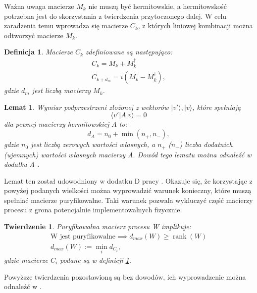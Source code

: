 \documentclass[10pt]{article} %
\newtheorem{definicja}{Definicja}
\newtheorem{tw}{Twierdzenie}
\newtheorem{lm}{Lemat}
\DeclareMathOperator{\Rank}{rank}
\newcommand{\Ket}[1]{|#1\rangle}
\newcommand{\Bra}[1]{\langle#1|}
\newcommand{\LPV}{{L^\perp_V}}
\begin{document}
Ważna uwaga macierze $M_k$ nie muszą być hermitowskie, a hermitowskość potrzebna jest do skorzystania z twierdzenia przytoczonego dalej. W celu zaradzenia temu wprowadza się macierze $C_k$, z których liniowej kombinacji można odtworzyć macierze $M_k$.
\begin{definicja}
\label{ck}
Macierze $C_k$ zdefiniowane są następująco:
\begin{equation}
\begin{gathered}
C_k = M_k + M_k^\dag \\
C_{k+d_m} = i(M_k - M_k^\dag),
\end{gathered}
\end{equation}
gdzie $d_m$ jest liczbą macierzy $M_k$.
\end{definicja}
\begin{lm}
Wymiar podprzestrzeni złożonej z wektorów $\Ket{v'}, \Ket{v}$, które spełniają
\begin{equation}
\Bra{v'}A\Ket{v} = 0
\end{equation} dla pewnej macierzy hermitowskiej $A$ to:
\begin{equation}
d_{A} = n_{0} + \min(n_{+}, n_{-}),
\end{equation}
gdzie $n_{0}$ jest liczbą zerowych wartości własnych, a $n_{+}$ ($n_{-}$) liczba dodatnich (ujemnych) wartości własnych macierzy A. Dowód tego lematu można odnaleźć w dodatku A \cite{purification}.
\end{lm}
Lemat ten został udowodniony w dodatku D pracy \cite{purification}.
Okazuje się, że korzystając z powyżej podanych wielkości można wyprowadzić warunek konieczny, które muszą spełniać macierze puryfikowalne. Taki warunek pozwala wykluczyć część macierzy procesu z grona potencjalnie implementowalnych fizycznie.
\begin{tw}
Puryfikowalna macierz procesu W implikuje:
\begin{gather}
\text{W jest puryfikowalne} \implies d_{max}(W) \geq \Rank(W) \\
d_{max}(W) := \min_i d_{C_i} ,
\end{gather}
gdzie macierze $C_i$ podane są w definicji \ref{ck}.
\end{tw}
Powyższe twierdzenia pozostawioną są bez dowodów, ich wyprowadzenie można odnaleźć w \cite{purification}.
\end{document}

